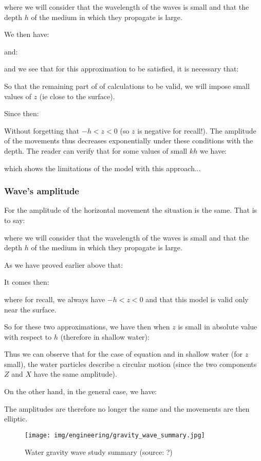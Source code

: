 	where we will consider that the wavelength of the waves is small and that the depth $h$ of the medium in which they propagate is large.

	We then have:
	
	and:
	
	and we see that for this approximation to be satisfied, it is necessary that:
	
	So that the remaining part of of calculations to be valid, we will impose small values of $z$ (ie close to the surface).

	Since then:
	
	Without forgetting that $-h<z<0$ (so $z$ is negative for recall!). The amplitude of the movements thus decreases exponentially under these conditions with the depth. The reader can verify that for some values of small $kh$ we have:
	
	which shows the limitations of the model with this approach...
	
	\subsubsection{Wave's amplitude}
	For the amplitude of the horizontal movement the situation is the same. That is to say:
	
	where we will consider that the wavelength of the waves is small and that the depth $h$ of the medium in which they propagate is large.

	As we have proved earlier above that:
	
	It comes then:
	
	where for recall, we always have $-h<z<0$ and that this model is valid only near the surface.

	So for these two approximations, we have then when $z$ is small in absolute value with respect to $h$ (therefore in shallow water):
	
	Thus we can observe that for the case of equation and in shallow water (for $z$ small), the water particles describe a circular motion (since the two components $Z$ and $X$ have the same amplitude).

	On the other hand, in the general case, we have:
	
	The amplitudes are therefore no longer the same and the movements are then elliptic.
	\begin{figure}[H]
		\centering
		\texttt{[image: img/engineering/gravity\_wave\_summary.jpg]}	
		\caption{Water gravity wave study summary (source: ?)}
	\end{figure}

